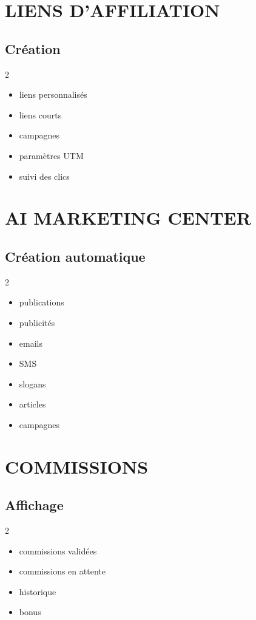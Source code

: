 \documentclass[12pt,a4paper,oneside]{book}
\begin{document}
\chapter{LIENS D'AFFILIATION}

\section{Création}
\begin{multicols}{2}
\begin{itemize}
\item liens personnalisés
\item liens courts
\item campagnes
\item paramètres UTM
\item suivi des clics
\end{itemize}
\end{multicols}

\chapter{AI MARKETING CENTER}

\section{Création automatique}
\begin{multicols}{2}
\begin{itemize}
\item publications
\item publicités
\item emails
\item SMS
\item slogans
\item articles
\item campagnes
\end{itemize}
\end{multicols}

\chapter{COMMISSIONS}

\section{Affichage}
\begin{multicols}{2}
\begin{itemize}
\item commissions validées
\item commissions en attente
\item historique
\item bonus
\end{itemize}
\end{multicols}
\end{document}
